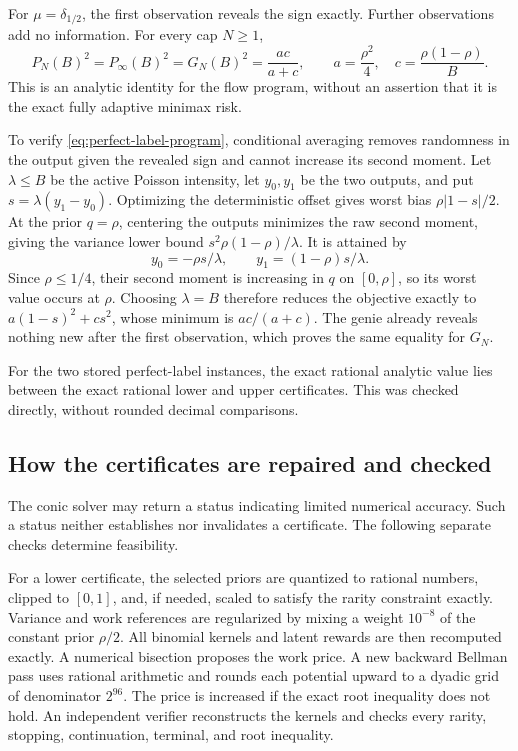 For $\mu=\delta_{1/2}$, the first observation reveals the sign exactly.
Further observations add no information. For every cap $N\ge1$,
\begin{equation}\label{eq:perfect-label-program}
 P_N(B)^2=P_\infty(B)^2=G_N(B)^2
 =\frac{ac}{a+c},
 \qquad
 a=\frac{\rho^2}{4},\quad c=\frac{\rho(1-\rho)}{B}.
\end{equation}
This is an analytic identity for the flow program, without an assertion
that it is the exact fully adaptive minimax risk.

To verify \eqref{eq:perfect-label-program}, conditional averaging removes
randomness in the output given the revealed sign and cannot increase
its second moment. Let $\lambda\le B$ be the active Poisson intensity,
let $y_0,y_1$ be the two outputs, and put
$s=\lambda(y_1-y_0)$. Optimizing the deterministic offset gives worst
bias $\rho|1-s|/2$. At the prior $q=\rho$, centering the outputs minimizes
the raw second moment, giving the variance lower bound
$s^2\rho(1-\rho)/\lambda$. It is attained by
\[
 y_0=-\rho s/\lambda,\qquad y_1=(1-\rho)s/\lambda.
\]
Since $\rho\le1/4$, their second moment is increasing in $q$ on
$[0,\rho]$, so its worst value occurs at $\rho$. Choosing $\lambda=B$
therefore reduces the objective exactly to
$a(1-s)^2+cs^2$, whose minimum is $ac/(a+c)$.
The genie already reveals nothing new after the first observation,
which proves the same equality for $G_N$.

For the two stored perfect-label instances, the exact rational analytic
value lies between the exact rational lower and upper certificates.
This was checked directly, without rounded decimal comparisons.

\subsection{How the certificates are repaired and checked}

The conic solver may return a status indicating limited numerical
accuracy. Such a status neither establishes nor invalidates a certificate.
The following separate checks determine feasibility.

For a lower certificate, the selected priors are quantized to rational
numbers, clipped to $[0,1]$, and, if needed, scaled to satisfy the rarity
constraint exactly. Variance and work references are regularized by
mixing a weight $10^{-8}$ of the constant prior $\rho/2$.
All binomial kernels and latent rewards are then recomputed exactly.
A numerical bisection proposes the work price. A new backward Bellman
pass uses rational arithmetic and rounds each potential upward to a
dyadic grid of denominator $2^{96}$. The price is increased if the
exact root inequality does not hold. An independent verifier reconstructs
the kernels and checks every rarity, stopping, continuation, terminal,
and root inequality.

